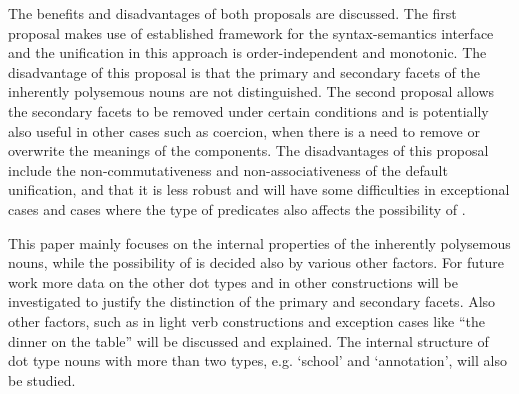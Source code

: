 \documentclass[output=paper,colorlinks,citecolor=brown,chinesefont]{langscibook}
\begin{document}
{The benefits and disadvantages of both proposals are discussed. The first proposal makes use of established framework for the syntax-semantics interface and the unification in this approach is order-independent and monotonic. The disadvantage of this proposal is that the primary and secondary facets of the inherently polysemous nouns are not distinguished. The second proposal allows the secondary facets to be removed under certain conditions and is potentially also useful in other cases such as coercion, when there is a need to remove or overwrite the meanings of the components. The disadvantages of this proposal include the non-commutativeness and non-associativeness of the default unification, and that it is less robust and will have some difficulties in exceptional cases and cases where the type of predicates also affects the possibility of .

This paper mainly focuses on the internal properties of the inherently polysemous nouns, while the possibility of  is decided also by various other factors. For future work more data on the other dot types and in other  constructions will be investigated to justify the distinction of the primary and secondary facets. Also other factors, such as  in light verb constructions and exception cases like ``the dinner on the table'' will be discussed and explained. The internal structure of dot type nouns with more than two types, e.g. `school' and `annotation', will also be studied.
}
\end{document}
